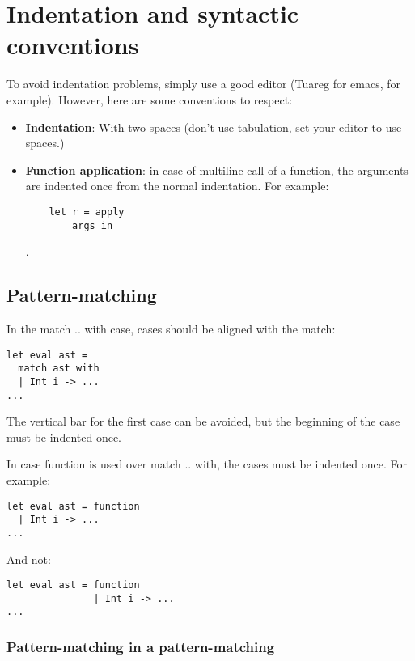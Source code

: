 \documentclass[12pt,a4paper]{article}
\begin{document}
\section{Indentation and syntactic conventions}

To avoid indentation problems, simply use a good editor (Tuareg for emacs, for
example). However, here are some conventions to respect:

\begin{itemize}
\item \textbf{Indentation}: With two-spaces (don't use tabulation, set your
  editor to use spaces.)
\item \textbf{Function application}: in case of multiline call of a function,
  the arguments are indented once from the normal indentation. For example:
  \begin{verbatim}
    let r = apply
        args in
  \end{verbatim}.
\end{itemize}

\subsection*{Pattern-matching}

In the \textsf{match .. with} case, cases should be aligned with the
\textsf{match}:

\begin{verbatim}
let eval ast =
  match ast with
  | Int i -> ...
...
\end{verbatim}

The vertical bar for the first case can be avoided, but the beginning of the
case must be indented once.

In case \textsf{function} is used over \textsf{match .. with}, the cases must be
indented once. For example:

\begin{verbatim}
let eval ast = function
  | Int i -> ...
...
\end{verbatim}

And not:


\begin{verbatim}
let eval ast = function
               | Int i -> ...
...
\end{verbatim}

\subsubsection*{Pattern-matching in a pattern-matching}
\end{document}
